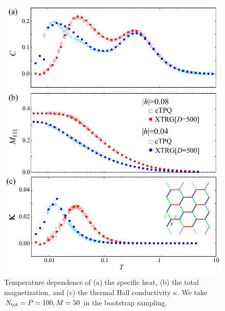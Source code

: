 \documentclass[reprint,amsmath,amssymb,aps,prx]{revtex4-2}
\begin{document}
\begin{figure}[tbh] 
\begin{center} 
\includegraphics[width=0.9\linewidth]{Figs/compXTRG_3_o.pdf}
\vspace{-0.5cm} 
\caption{Temperature dependence of (a) the specific heat, (b) the total magnetization, and
(c) the thermal Hall conductivity $\kappa$. 
We take $N_{\rm tot}=P=100,M=50$ in the bootstrap sampling.}
\label{comp_XTRG}
\end{center}
\end{figure}


\end{document}
